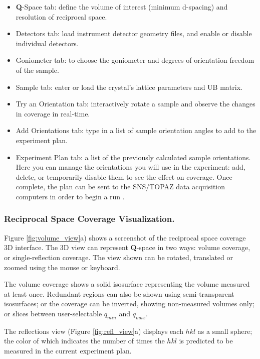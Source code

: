 \documentclass[final]{iucr}              %
\begin{document}
\begin{itemize}
  	\item {\bf Q}-Space tab: define the volume of interest (minimum d-spacing)
  	and resolution of reciprocal space. 
 	\item Detectors tab: load instrument detector geometry
files, and enable or disable individual detectors. 
	\item Goniometer tab: to choose the
goniometer and degrees of orientation freedom of the sample.
  	\item Sample tab: enter or load the crystal's lattice parameters and UB
  matrix.
  	\item Try an Orientation tab: interactively rotate a sample and observe the
  changes in coverage in real-time.
  	\item Add Orientations tab: type in a list of sample orientation angles to
  add to the experiment plan.
 
  	\item Experiment Plan tab: a list of the previously calculated sample
orientations. Here you can manage the orientations you will use in the experiment: add,
delete, or temporarily disable them to see the effect on coverage. Once
complete, the plan can be sent to the SNS/TOPAZ data acquisition computers in
order to begin a run \cite{SNSDAS}.
    
\end{itemize} 



\subsubsection{Reciprocal Space Coverage Visualization.}
Figure \ref{fig:volume_view}a) shows a screenshot of the reciprocal space
coverage 3D interface. The 3D view can represent {\bf Q}-space in two ways: volume coverage, or single-reflection
coverage. The view shown can be rotated, translated or zoomed using the mouse or
keyboard.

The volume coverage shows a solid isosurface representing the volume measured at
least once. Redundant regions can also be shown using semi-transparent
isosurfaces; or the coverage can be inverted, showing non-measured volumes only;
or slices between user-selectable $q_{min}$ and $q_{max}$.        

The reflections view (Figure \ref{fig:refl_view}a) displays each $hkl$ as a
small sphere; the color of which indicates the number of times the $hkl$ is
predicted to be measured in the current experiment plan.        
\end{document}

